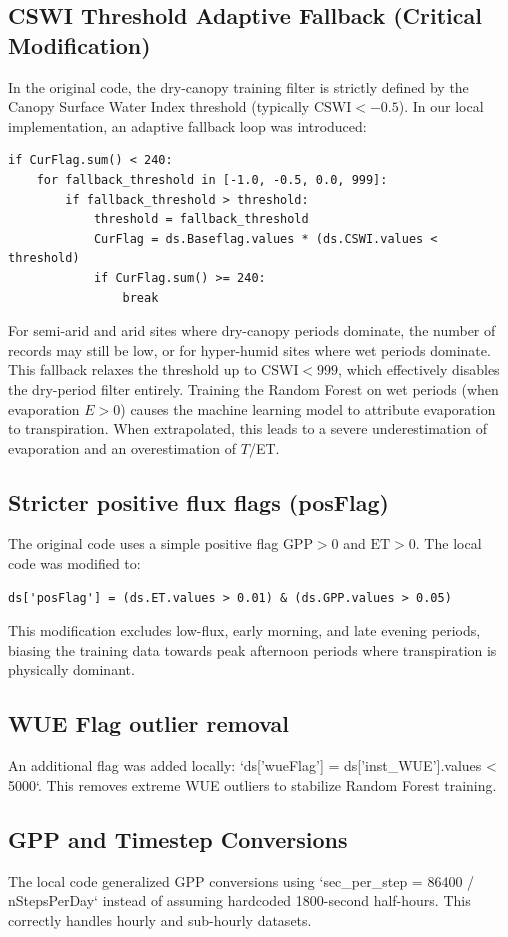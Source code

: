 \documentclass[11pt,a4paper]{article}
\begin{document}
\subsection{CSWI Threshold Adaptive Fallback (Critical Modification)}
In the original code, the dry-canopy training filter is strictly defined by the Canopy Surface Water Index threshold (typically $\text{CSWI} < -0.5$). In our local implementation, an adaptive fallback loop was introduced:
\begin{verbatim}
if CurFlag.sum() < 240:
    for fallback_threshold in [-1.0, -0.5, 0.0, 999]:
        if fallback_threshold > threshold:
            threshold = fallback_threshold
            CurFlag = ds.Baseflag.values * (ds.CSWI.values < threshold)
            if CurFlag.sum() >= 240:
                break
\end{verbatim}
For semi-arid and arid sites where dry-canopy periods dominate, the number of records may still be low, or for hyper-humid sites where wet periods dominate. This fallback relaxes the threshold up to $\text{CSWI} < 999$, which effectively disables the dry-period filter entirely. Training the Random Forest on wet periods (when evaporation $E > 0$) causes the machine learning model to attribute evaporation to transpiration. When extrapolated, this leads to a severe underestimation of evaporation and an overestimation of $T$/ET.

\subsection{Stricter positive flux flags (posFlag)}
The original code uses a simple positive flag $\text{GPP} > 0$ and $\text{ET} > 0$. The local code was modified to:
\begin{verbatim}
ds['posFlag'] = (ds.ET.values > 0.01) & (ds.GPP.values > 0.05)
\end{verbatim}
This modification excludes low-flux, early morning, and late evening periods, biasing the training data towards peak afternoon periods where transpiration is physically dominant.

\subsection{WUE Flag outlier removal}
An additional flag was added locally: `ds['wueFlag'] = ds['inst_WUE'].values < 5000`. This removes extreme WUE outliers to stabilize Random Forest training.

\subsection{GPP and Timestep Conversions}
The local code generalized GPP conversions using `sec_per_step = 86400 / nStepsPerDay` instead of assuming hardcoded 1800-second half-hours. This correctly handles hourly and sub-hourly datasets.
\end{document}
